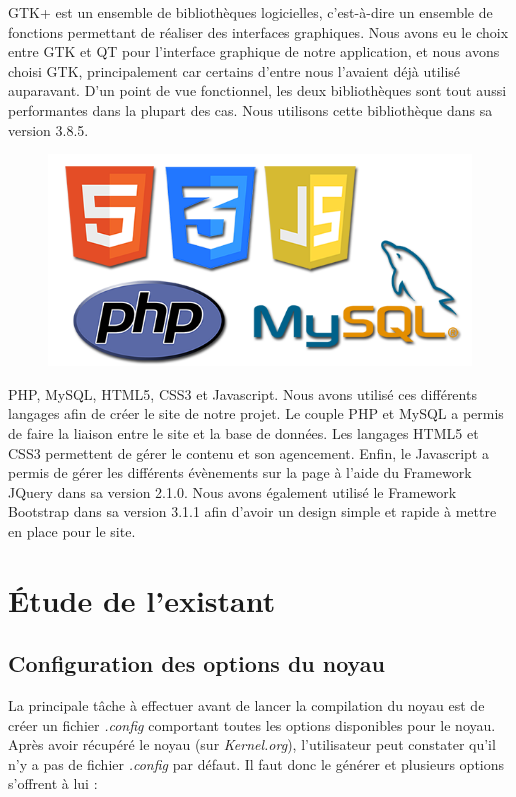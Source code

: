 \documentclass[17pts]{report}
\begin{document}
GTK+ est un ensemble de bibliothèques logicielles, c'est-à-dire un
ensemble de fonctions permettant de réaliser des interfaces graphiques.  Nous
avons eu le choix entre GTK et QT pour l'interface graphique de notre
application, et nous avons choisi GTK, principalement car certains d'entre nous
l'avaient déjà utilisé auparavant. D'un point de vue fonctionnel, les deux
bibliothèques sont tout aussi performantes dans la plupart des cas. Nous
utilisons cette bibliothèque dans sa version 3.8.5.\\

\begin{figure}[H]
    \includegraphics[scale=0.3]{illustrations/html-css-js-php-mysql.png}
    \centering
\end{figure}

PHP, MySQL, HTML5, CSS3 et Javascript. Nous avons utilisé ces différents
langages afin de créer le site de notre projet. Le couple PHP et MySQL a
permis de faire la liaison entre le site et la base de données. Les langages
HTML5 et CSS3 permettent de gérer le contenu et son agencement.  Enfin, le
Javascript a permis de gérer les différents évènements sur la page à l'aide du
Framework JQuery dans sa version 2.1.0. Nous avons également utilisé le
Framework Bootstrap dans sa version 3.1.1 afin d'avoir un design simple et
rapide à mettre en place pour le site.

\chapter{Étude de l'existant}\thispagestyle{IHA-fancy-style}
\label{cha:Étude de l'existant}
\section{Configuration des options du noyau}
\label{sec:Configuration des options du noyau}
La principale tâche à effectuer avant de lancer la compilation du noyau est de
créer un fichier \textit{.config} comportant toutes les options disponibles
pour le noyau.  Après avoir récupéré le noyau (sur \textit{Kernel.org}),
l'utilisateur peut constater qu’il n’y a pas de fichier \textit{.config} par
défaut.  Il faut donc le générer et plusieurs options s’offrent à lui : \\
\end{document}
